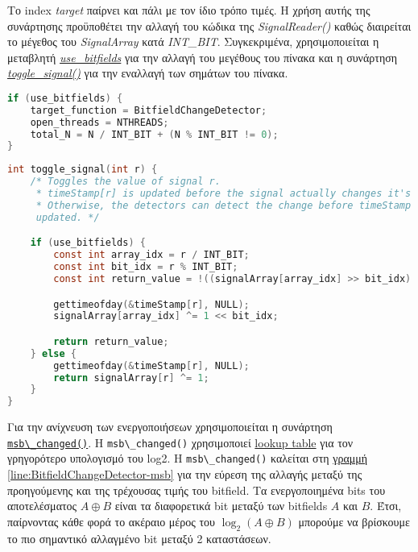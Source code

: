 Το index \textit{target} παίρνει και πάλι με τον ίδιο τρόπο τιμές.
Η χρήση αυτής της συνάρτησης προϋποθέτει την αλλαγή του κώδικα της 
\textit{SignalReader()} 
καθώς διαιρείται το μέγεθος του \textit{SignalArray} κατά \textit{INT\_BIT}. 
Συγκεκριμένα, χρησιμοποιείται η μεταβλητή 
\hyperref[lst:total_N]{\textit{use\_bitfields}} για την αλλαγή του μεγέθους του 
πίνακα και η συνάρτηση \hyperref[lst:togle_signal]{\textit{toggle\_signal()}} 
για την εναλλαγή των σημάτων του πίνακα.
\begin{lstlisting}[language=c, caption={Αλλαγή μεγέθους του SignalArray}, 
escapechar=$, label={lst:total_N}]
if (use_bitfields) {
    target_function = BitfieldChangeDetector;
    open_threads = NTHREADS;
    total_N = N / INT_BIT + (N % INT_BIT != 0);
}
\end{lstlisting}
\begin{lstlisting}[language=c, caption={toggle\_signal()}, 
escapechar=$, label={lst:togle_signal}]
int toggle_signal(int r) {
    /* Toggles the value of signal r.
     * timeStamp[r] is updated before the signal actually changes it's value.
     * Otherwise, the detectors can detect the change before timeStamp is 
     updated. */

    if (use_bitfields) {
        const int array_idx = r / INT_BIT;
        const int bit_idx = r % INT_BIT;
        const int return_value = !((signalArray[array_idx] >> bit_idx) & 1);

        gettimeofday(&timeStamp[r], NULL);
        signalArray[array_idx] ^= 1 << bit_idx;

        return return_value;
    } else {
        gettimeofday(&timeStamp[r], NULL);
        return signalArray[r] ^= 1;
    }
}
\end{lstlisting}
Για την ανίχνευση των ενεργοποιήσεων χρησιμοποιείται η συνάρτηση 
\hyperref[lst:msb_changed]{\lstinline!msb\_changed()!}. H \lstinline!msb\_changed()!
χρησιμοποιεί 
\href{https://graphics.stanford.edu/~seander/bithacks.html#IntegerLogLookup}{lookup
 table} για τον γρηγορότερο υπολογισμό του log2. H \lstinline!msb\_changed()!
 καλείται στη
 \hyperref[line:BitfieldChangeDetector-msb]{γραμμή 
 \ref*{line:BitfieldChangeDetector-msb}} για την εύρεση της αλλαγής μεταξύ της 
 προηγούμενης και της τρέχουσας τιμής του bitfield.
 Τα ενεργοποιημένα bits του αποτελέσματος $A \oplus B$ είναι τα διαφορετικά bit 
 μεταξύ των bitfields $A$ και $B$.
 Έτσι, παίρνοντας κάθε φορά το ακέραιο μέρος του $\log_2 \left( A \oplus B 
 \right)$ 
 μπορούμε να βρίσκουμε το πιο σημαντικό αλλαγμένο bit μεταξύ 2 καταστάσεων.
